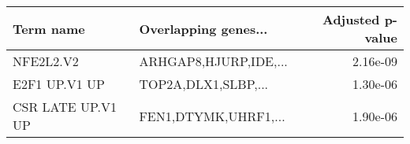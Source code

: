 \begin{tabular}{llr}
\toprule
        Term name &  Overlapping genes... &  Adjusted p-value \\
\midrule
        NFE2L2.V2 & ARHGAP8,HJURP,IDE,... &          2.16e-09 \\
    E2F1 UP.V1 UP &   TOP2A,DLX1,SLBP,... &          1.30e-06 \\
CSR LATE UP.V1 UP &  FEN1,DTYMK,UHRF1,... &          1.90e-06 \\
\bottomrule
\end{tabular}
